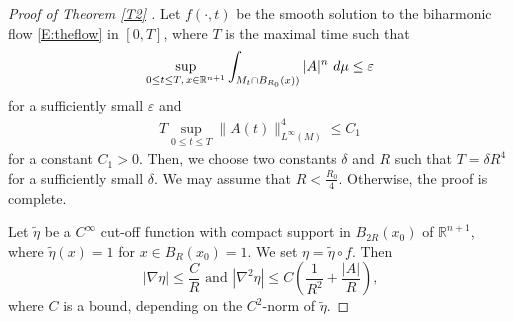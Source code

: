 \documentclass{amsart}
\theoremstyle{definition}
\def\R{{\Bbb R}}
\numberwithin{equation}{section}
\begin{document}
\begin{proof}[Proof of Theorem   \ref{T2} ]
Let $f(\cdot, t)$ be the smooth solution to the biharmonic flow \eqref{E:theflow} in $[0,  T]$, where $T$ is the maximal time such that
\begin{align} \label{M.0.1}\sup_{0 \leq t \leq T,\,
x\in\R^{n+1}} \int_{ M_t\cap B_{R_0}(x))}   |A|^{n}\  d\mu \leq \varepsilon
  \end{align}
for  a sufficiently small $\varepsilon$ and
\begin{align} \label{M.0.2}  T  \sup_{0\leq t\leq T}\|A(t)\|^4_{L^{\infty}(M)}   \leq C_1
  \end{align} for a  constant $C_1>0$.
Then, we choose  two constants $\delta$ and $R$ such that $T= {\delta}{R^4}$ for  a sufficiently small $\delta$.
We may assume that $R<\frac {R_0}4$. Otherwise, the proof is complete.

 Let  $\tilde \eta$ be a $C^{\infty}$ cut-off function with compact support in $B_{2R}(x_0)$  of
 $\mathbb{R}^{n+1}$, where $\tilde \eta (x) =1$ for  $x\in
B_{R}(x_0)=1$.  We   set $\eta = \tilde \eta \circ f$. Then
$$\left| \nabla \eta\right| \leq \frac {C}{R} \mbox{ and } \left| \nabla^{2} \eta \right| \leq C \left(\frac 1 {R^2}+\frac {
\left| A \right|}{R}\right)
\mbox{,}$$
where $C$ is a bound, depending on the $C^{2}$-norm of $\tilde \eta$.



\end{proof}
\end{document}
